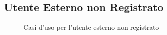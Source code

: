\subsection{Utente Esterno non Registrato}\label{subsec:uc_unregistered}

\begin{figure}[H]
    \centering
    
    \caption{Casi d'uso per l'utente esterno non registrato}
\end{figure}

